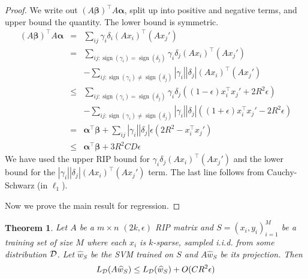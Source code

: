 \documentclass[english]{article}
\theoremstyle{plain}
\newtheorem{theorem}{Theorem}
\DeclareMathOperator{\sign}{sign}
\begin{document}
\begin{proof}
We write out $\left(A\bm{\beta}\right)^{\top}A\bm{\alpha}$, split
up into positive and negative terms, and upper bound the quantity.
The lower bound is symmetric.
\begin{eqnarray*}
\left(A\bm{\beta}\right)^{\top}A\bm{\alpha} & = & \sum_{ij}\gamma_{i}\delta_{i}\left(Ax_{i}\right)^{\top}\left(Ax_{j}'\right)\\
 & = & \sum_{ij:\sign(\gamma_{i})=\sign(\delta_{j})}\gamma_{i}\delta_{j}\left(Ax_{i}\right)^{\top}\left(Ax_{j}'\right)\\
 &  & -\sum_{ij:\sign(\gamma_{i})\neq\sign(\delta_{j})}\left|\gamma_{i}\right|\left|\delta_{j}\right|\left(Ax_{i}\right)^{\top}\left(Ax_{j}'\right)\\
 & \leq & \sum_{ij:\sign(\gamma_{i})=\sign(\delta_{j})}\gamma_{i}\delta_{j}\left((1-\epsilon)x_{i}^{\top}x_{j}'+2R^{2}\epsilon\right)\\
 &  & -\sum_{ij:\sign(\gamma_{i})\neq\sign(\delta_{j})}\left|\gamma_{i}\right|\left|\delta_{j}\right|\left((1+\epsilon)x_{i}^{\top}x_{j}'-2R^{2}\epsilon\right)\\
 & = & \bm{\alpha}^{\top}\bm{\beta}+\sum_{ij}\left|\gamma_{i}\right|\left|\delta_{j}\right|\epsilon\left(2R^{2}-x_{i}^{\top}x_{j}'\right)\\
 & \leq & \bm{\alpha}^{\top}\bm{\beta}+3R^{2}CD\epsilon
\end{eqnarray*}
We have used the upper RIP bound for $\gamma_{i}\delta_{j}\left(Ax_{i}\right)^{\top}\left(Ax_{j}'\right)$
and the lower bound for the $\left|\gamma_{i}\right|\left|\delta_{j}\right|\left(Ax_{i}\right)^{\top}\left(Ax_{j}'\right)$
term. The last line follows from Cauchy-Schwarz (in $\ell_{1}$).

Now we prove the main result for regression.
\end{proof}
\begin{theorem}
\label{thm:regression}
Let $A$ be a $m \times n$ $(2k, \epsilon)$ RIP matrix and $S = {(x_i,y_i)_{i=1}^M}$ be a training set of size $M$ where each $x_i$ is $k$-sparse, sampled i.i.d. from some distribution $\cal D$. Let $\widehat{w}_S$ be the SVM trained on $S$ and $A\widehat{w}_S$ be its projection. Then
\[
L_{\cal D}(A\widehat{w}_S) \leq L_{\cal D}(\widehat{w}_S) + O(CR^2 \epsilon)
\]
\end{theorem}
\end{document}
